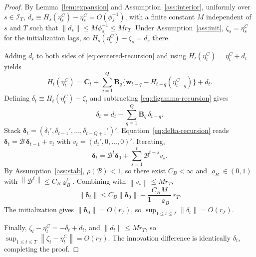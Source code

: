 \documentclass[10pt,a4paper]{amsart}
\newcommand{\bfB}{\mathbf{B}}
\newcommand{\bfC}{\mathbf{C}}
\newcommand{\bfw}{\mathbf{w}}
\newcommand{\norm}[1]{\left\lVert#1\right\rVert}
\begin{document}
\begin{proof}
By Lemma~\ref{lem:expansion} and Assumption~\ref{ass:interior}, uniformly over $s\in\mathcal{I}_T$,
$d_s\equiv H_s(\eta_s^{C})-\eta_s^{C}=O(\phi_s^{-1})$, with a finite constant $M$ independent of $s$ and $T$ such that $\norm{d_s}\le M\phi_s^{-1}\le Mr_T$. Under Assumption~\ref{ass:init}, $\zeta_s=\eta_s^{C}$ for the initialization lags, so $H_s(\eta_s^{C})-\zeta_s=d_s$ there.

Adding $d_t$ to both sides of \eqref{eq:centered-recursion} and using $H_t(\eta_t^C)=\eta_t^C+d_t$ yields
\[
H_t(\eta_t^{C})=\bfC_t+\sum_{q=1}^Q \bfB_q\{\bfw_{t-q}-H_{t-q}(\eta_{t-q}^{C})\}+d_t.
\]
Defining $\delta_t\equiv H_t(\eta_t^{C})-\zeta_t$ and subtracting \eqref{eq:digamma-recursion} gives
\begin{equation}\label{eq:delta-recursion}
\delta_t=d_t-\sum_{q=1}^Q \bfB_q\,\delta_{t-q}.
\end{equation}
Stack $\bm{\delta}_t=(\delta_t',\delta_{t-1}',\ldots,\delta_{t-Q+1}')'$. Equation~\eqref{eq:delta-recursion} reads $\bm{\delta}_t=\mathcal{B}\,\bm{\delta}_{t-1}+v_t$ with $v_t=(d_t',0,\ldots,0)'$. Iterating,
\[
\bm{\delta}_t=\mathcal{B}^{t}\bm{\delta}_0+\sum_{s=1}^{t}\mathcal{B}^{t-s}v_s.
\]
By Assumption~\ref{ass:stab}, $\rho(\mathcal{B})<1$, so there exist $C_B<\infty$ and $\varrho_B\in(0,1)$ with $\norm{\mathcal{B}^\ell}\le C_B\varrho_B^\ell$. Combining with $\norm{v_s}\le Mr_T$,
\[
\norm{\bm{\delta}_t}\le C_B\norm{\bm{\delta}_0}+\frac{C_B M}{1-\varrho_B}\,r_T.
\]
The initialization gives $\norm{\bm{\delta}_0}=O(r_T)$, so $\sup_{1\le t\le T}\norm{\delta_t}=O(r_T)$.

Finally, $\zeta_t-\eta_t^{C}=-\delta_t+d_t$, and $\norm{d_t}\le Mr_T$, so $\sup_{1\le t\le T}\norm{\zeta_t-\eta_t^{C}}=O(r_T)$. The innovation difference is identically $\delta_t$, completing the proof.
\end{proof}
\end{document}
